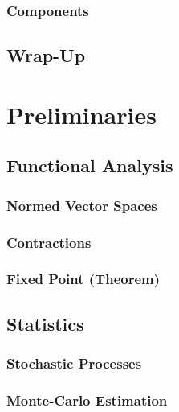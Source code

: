         \subsection{Components} %

    \section{Wrap-Up} %

\chapter{Preliminaries} %

    \section{Functional Analysis} %

        \subsection{Normed Vector Spaces} %

        \subsection{Contractions} %

        \subsection{Fixed Point (Theorem)} %

    \section{Statistics} %

        \subsection{Stochastic Processes} %

        \subsection{Monte-Carlo Estimation} %

